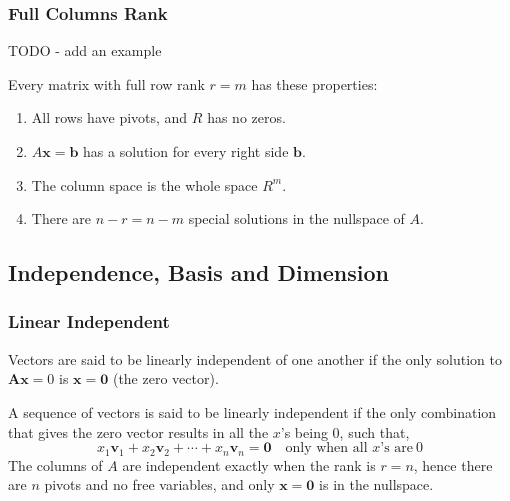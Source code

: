         \subsubsection{Full Columns Rank}

            TODO - add an example

            \par \hfill \break
            Every matrix with full row rank \( r=m \) has these properties:
            \begin{enumerate}
                \item All rows have pivots, and \( R \) has no zeros.
                \item \( A\boldsymbol{x}=\boldsymbol{b} \) has a solution for every right side \(\boldsymbol{b}\).
                \item The column space is the whole space \(R^m \).
                \item There are \( n-r=n-m \) special solutions in the nullspace of \( A \).
            \end{enumerate}
        
    \subsection{Independence, Basis and Dimension}

        \subsubsection{Linear Independent}
            Vectors are said to be linearly independent of one another if the only solution to \( \boldsymbol{Ax} = 0\) 
            is \( \boldsymbol{x} = \boldsymbol{0} \) (the zero vector).

            \par \hfill \break
            A sequence of vectors is said to be linearly independent if the only combination that gives the zero vector
            results in all the \(x\)'s being \(0\), such that,
            \begin{equation}
                x_1 \boldsymbol{v}_1 + x_2 \boldsymbol{v}_2 + \cdots + x_n \boldsymbol{v}_n = \boldsymbol{0}
                \quad \textrm{only when all \(x\)'s are} \ 0 
            \end{equation}
            The columns of \( A \) are independent exactly when the rank is \( r = n \), hence there are \( n \) pivots
            and no free variables, and only \( \boldsymbol{x} = \boldsymbol{0} \) is in the nullspace.
        

